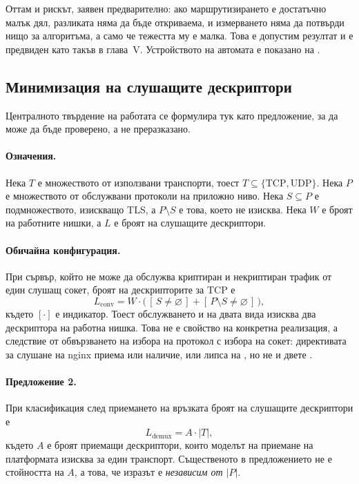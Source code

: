 Оттам и рискът, заявен предварително: ако маршрутизирането е достатъчно малък дял, разликата
няма да бъде откриваема, и измерването няма да потвърди нищо за алгоритъма, а само че
тежестта му е малка. Това е допустим резултат и е предвиден като такъв в глава~V. Устройството
на автомата е показано на .



\subsection{Минимизация на слушащите дескриптори}
\label{sec:formal}

Централното твърдение на работата се формулира тук като предложение, за да може да бъде
проверено, а не преразказано.

\paragraph{Означения.} Нека \(T\) е множеството от използвани транспорти, тоест
\(T \subseteq \{\mathrm{TCP}, \mathrm{UDP}\}\). Нека \(P\) е множеството от обслужвани
протоколи на приложно ниво. Нека \(S \subseteq P\) е подмножеството, изискващо TLS, а
\(P \setminus S\) е това, което не изисква. Нека \(W\) е броят на работните нишки, а
\(L\) е броят на слушащите дескриптори.

\paragraph{Обичайна конфигурация.} При сървър, който не може да обслужва криптиран и
некриптиран трафик от един слушащ сокет, броят на дескрипторите за TCP е
\[
L_{\text{conv}} = W \cdot \bigl(\,[\,S \neq \varnothing\,] + [\,P \setminus S \neq \varnothing\,]\,\bigr),
\]
където \([\cdot]\) е индикатор. Тоест обслужването и на двата вида изисква два дескриптора на
работна нишка. Това не е свойство на конкретна реализация, а следствие от обвързването на
избора на протокол с избора на сокет: директивата за слушане на nginx приема или наличие, или
липса на , но не и двете \cite{nginxlisten}.

\paragraph{Предложение 2.} При класификация след приемането на връзката броят на слушащите
дескриптори е
\[
L_{\text{demux}} = A \cdot |T|,
\]
където \(A\) е броят приемащи дескриптори, които моделът на приемане на платформата изисква
за един транспорт. Същественото в предложението не е стойността на \(A\), а това, че изразът
е \emph{независим от \(|P|\)}.

